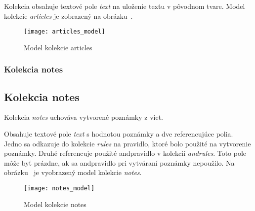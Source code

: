 Kolekcia obsahuje textové pole \textit{text} na uloženie textu v pôvodnom tvare. Model kolekcie \textit{articles} je zobrazený na obrázku~.

\begin{figure}[H]
	\begin{center}\texttt{[image: articles\_model]}\end{center}
	\caption[Model kolekcie articles]{Model kolekcie articles}\label{fig:articles_collection_model}
\end{figure}

%
%
{
	\subsubsection{Kolekcia notes}
}
{
	\subsection{Kolekcia notes}
}
\label{subsubsection:collection_notes}
Kolekcia \textit{notes} uchováva vytvorené poznámky z viet.

Obsahuje textové pole \textit{text} s hodnotou poznámky a dve referencujúce polia. Jedno sa odkazuje do kolekcie \textit{rules} na pravidlo, ktoré bolo použité na vytvorenie poznámky. Druhé referencuje použité and\hyph pravidlo v kolekcií \textit{and\textunderscore rules}. Toto pole môže byť prázdne, ak sa and\hyph pravidlo pri vytváraní poznámky nepoužilo. Na obrázku~ je vyobrazený model kolekcie \textit{notes}.

\begin{figure}[H]
	\begin{center}\texttt{[image: notes\_model]}\end{center}
	\caption[Model kolekcie notes]{Model kolekcie notes}\label{fig:notes_collection_model}
\end{figure}

